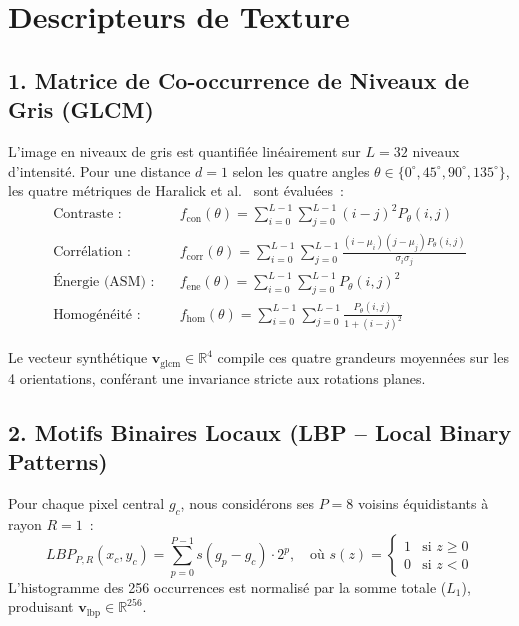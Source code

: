 \section{Descripteurs de Texture}

\subsection{1. Matrice de Co-occurrence de Niveaux de Gris (GLCM)}
L'image en niveaux de gris est quantifiée linéairement sur $L=32$ niveaux d'intensité. Pour une distance $d=1$ selon les quatre angles $\theta \in \{0^\circ, 45^\circ, 90^\circ, 135^\circ\}$, les quatre métriques de Haralick et al.~\cite{haralick1973textural} sont évaluées~:
\begin{align}
\text{Contraste~:} \quad & f_{\text{con}}(\theta) = \sum_{i=0}^{L-1}\sum_{j=0}^{L-1} (i - j)^2 P_{\theta}(i, j) \\
\text{Corrélation~:} \quad & f_{\text{corr}}(\theta) = \sum_{i=0}^{L-1}\sum_{j=0}^{L-1} \frac{(i - \mu_i)(j - \mu_j) P_{\theta}(i, j)}{\sigma_i \sigma_j} \\
\text{Énergie (ASM)~:} \quad & f_{\text{ene}}(\theta) = \sum_{i=0}^{L-1}\sum_{j=0}^{L-1} P_{\theta}(i, j)^2 \\
\text{Homogénéité~:} \quad & f_{\text{hom}}(\theta) = \sum_{i=0}^{L-1}\sum_{j=0}^{L-1} \frac{P_{\theta}(i, j)}{1 + (i - j)^2}
\end{align}

Le vecteur synthétique $\mathbf{v}_{\text{glcm}} \in \mathbb{R}^4$ compile ces quatre grandeurs moyennées sur les 4 orientations, conférant une invariance stricte aux rotations planes.

\subsection{2. Motifs Binaires Locaux (LBP -- Local Binary Patterns)}
Pour chaque pixel central $g_c$, nous considérons ses $P=8$ voisins équidistants à rayon $R=1$~:
\begin{equation}
LBP_{P, R}(x_c, y_c) = \sum_{p=0}^{P-1} s(g_p - g_c) \cdot 2^p, \quad \text{où } s(z) = \begin{cases} 1 & \text{si } z \ge 0 \\ 0 & \text{si } z < 0 \end{cases}
\end{equation}
L'histogramme des 256 occurrences est normalisé par la somme totale ($L_1$), produisant $\mathbf{v}_{\text{lbp}} \in \mathbb{R}^{256}$.

